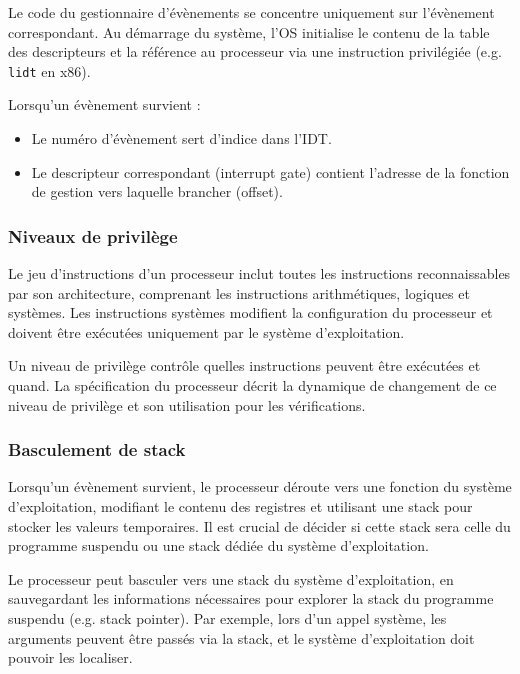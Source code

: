 Le code du gestionnaire d’évènements se concentre uniquement sur l’évènement correspondant. 
Au démarrage du système, l’OS initialise le contenu de la table des descripteurs et la référence au processeur via une instruction privilégiée (e.g. \texttt{lidt} en x86).

Lorsqu’un évènement survient :
\begin{itemize}
    \item Le numéro d’évènement sert d’indice dans l’IDT.
    \item Le descripteur correspondant (interrupt gate) contient l’adresse de la fonction de gestion vers laquelle brancher (offset).
\end{itemize}


\subsubsection{Niveaux de privilège}

Le jeu d'instructions d'un processeur inclut toutes les instructions reconnaissables par son architecture, comprenant les instructions arithmétiques, logiques et systèmes.
Les instructions systèmes modifient la configuration du processeur et doivent être exécutées uniquement par le système d'exploitation.

Un niveau de privilège contrôle quelles instructions peuvent être exécutées et quand. 
La spécification du processeur décrit la dynamique de changement de ce niveau de privilège et son utilisation pour les vérifications. 

\subsubsection{Basculement de stack}

Lorsqu’un évènement survient, le processeur déroute vers une fonction du système d’exploitation, modifiant le contenu des registres et utilisant une stack pour stocker les valeurs temporaires. 
Il est crucial de décider si cette stack sera celle du programme suspendu ou une stack dédiée du système d’exploitation.

Le processeur peut basculer vers une stack du système d’exploitation, en sauvegardant les informations nécessaires pour explorer la stack du programme suspendu (e.g. stack pointer). 
Par exemple, lors d'un appel système, les arguments peuvent être passés via la stack, et le système d’exploitation doit pouvoir les localiser.

